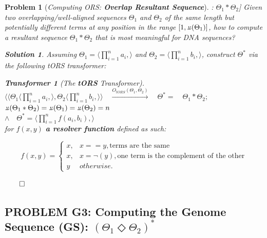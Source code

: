 \documentclass[a4paper, 18pt]{book} %
\newtheorem{transf}{Transformer}
\newtheorem{prob}{Problem}
\newtheorem{soln}{Solution}
\newcommand{\invpi}{\rotatebox[origin=c]{180}{$\pi$}}
\begin{document}
\begin{prob}[\textit{Computing ORS: \textbf{Overlap Resultant Sequence}}]: $\Theta_1 \ast \Theta_2$] 
\label{PROBORS}
Given two overlapping/well-aligned sequences $\Theta_1$ and $\Theta_2$ of the same length but potentially different terms at any position in the range $[1, \invpi(\Theta_1)]$, how to compute a resultant sequence $\Theta_1 \ast \Theta_2$ that is most meaningful for DNA sequences?

\begin{soln}
\label{SOLORS}
Assuming $\Theta_1 = \langle \prod\limits_{i=1}^n a_i, \rangle$ and $\Theta_2 = \langle \prod\limits_{i=1}^n b_i, \rangle$, construct $\Theta^*$ via the following tORS transformer:

\begin{transf}[The \textbf{tORS} Transformer]$ $\\
\label{TRANSFORS}
$\langle\langle \Theta_1\langle \prod\limits_{i=1}^n a_i, \rangle, \Theta_2\langle \prod\limits_{i=1}^n b_i, \rangle \rangle  \quad \xrightarrow{O_{tORS}(\Theta_1,\Theta_2)} \quad \Theta^* = 	 \quad \Theta_1 \ast \Theta_2;$\\
$\invpi(\Theta_1 \ast \Theta_2) = \invpi(\Theta_1) = \invpi(\Theta_2) = n$\\
$\land \quad \Theta^* = \langle \prod\limits_{i=1}^n f(a_i,b_i), \rangle$\\
 for $f(x,y)$ \textbf{a resolver function} defined as such:

\[
f(x,y) = 
\begin{cases}
x, & x == y, \text{terms are the same}\\
x, & x = \lnot(y), \text{one term is the complement of the other}\\
y & otherwise.
\end{cases}
\]

\end{transf}
$\qed$
\end{soln}
\end{prob}

\subsection{PROBLEM G3: Computing the Genome Sequence (GS): $(\Theta_1 \Diamond \Theta_2)^*$}
\label{SECCOMPGENSEQ}
\end{document}
